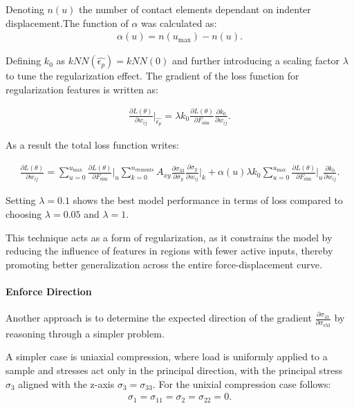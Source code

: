Denoting $n(u)$ the number of contact elements dependant on indenter displacement.The function of \(\alpha\) was calculated as:
\begin{align*}
    \alpha(u) = n(u_\text{max}) - n(u).
\end{align*}

Defining $k_0$ as $kNN(\hat{\epsilon_p}) = kNN(0)$ and further introducing a scaling factor $\lambda$ to tune the regularization effect. The gradient of the loss function for regularization features is written as:

\begin{align*}
    \frac{\partial L(\theta)}{\partial w_{ij}}\Big|_{\hat{\epsilon_p}}=
    \lambda k_0
    \frac{\partial L(\theta)}{\partial F_{\text{sim}}}
    \frac{\partial k_0}{\partial w_{ij}}.
\end{align*}

As a result the total loss function writes:

\begin{align*}
    \frac{\partial L(\theta)}{\partial w_{ij}}=
    \sum_{u=0}^{u_{\text{max}}}
    \frac{\partial L(\theta)}{\partial F_{\text{sim}}}\Big|_u
    \sum_{k=0}^{n_{\text{elements}}}
    A_{xy}
    \frac{\partial \sigma_{33}}{\partial \sigma_y}
    \frac{\partial \sigma_y}{\partial w_{ij}}\Big|_k 
    + 
    \alpha (u) \lambda k_0
    \sum_{u=0}^{u_{\text{max}}}
    \frac{\partial L(\theta)}{\partial F_{\text{sim}}}\Big|_u
    \frac{\partial k_0}{\partial w_{ij}}.
\end{align*}

Setting $\lambda = 0.1$ shows the best model performance in terms of loss compared to choosing $\lambda = 0.05$ and $\lambda = 1$.

This technique acts as a form of regularization, as it constrains the model by reducing the influence of features in regions with fewer active inputs, thereby promoting better generalization across the entire force-displacement curve.

\paragraph{Enforce Direction}
Another approach is to determine the expected direction of the gradient \(\frac{\partial \sigma_{33}}{\partial \sigma_{\text{vM}}}\) by reasoning through a simpler problem.


A simpler case is uniaxial compression, where load is uniformly applied to a sample and stresses act only in the principal direction, with the principal stress $\sigma_3$ aligned with the z-axis $\sigma_3 = \sigma_{33}$. For the unixial compression case follows:
\begin{align*}
    \sigma_{1} = \sigma_{11} = \sigma_{2} = \sigma_{22} = 0.
\end{align*}

